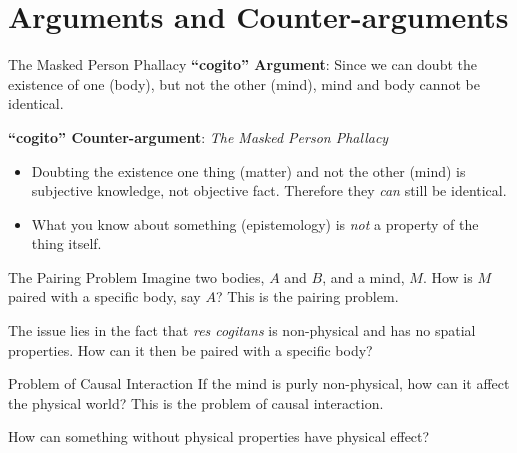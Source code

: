\documentclass[aspectratio=1610]{beamer}
\begin{document}
\section{Arguments and Counter-arguments}


\begin{frame}{The Masked Person Phallacy}
	\textbf{``cogito'' Argument}: Since we can doubt the existence of one (body), but not the other (mind), mind and body cannot be identical.

	\pause
	\vspace{2em}

	\textbf{``cogito'' Counter-argument}: \textit{The Masked Person Phallacy}
	\begin{itemize}
		\pause
		\item Doubting the existence one thing (matter) and not the other (mind) is subjective knowledge, not objective fact. Therefore they \textit{can} still be identical.
		\pause
		\item What you know about something (epistemology) is \textit{not} a property of the thing itself.
	\end{itemize}
\end{frame}


\begin{frame}{The Pairing Problem}
	Imagine two bodies, $A$ and $B$, and a mind, $M$. How is $M$ paired with a specific body, say $A$? This is the \alert{pairing problem}.

	\pause
	\vspace{2em}

	The issue lies in the fact that \textit{res cogitans} is non-physical and has no spatial properties. How can it then be paired with a specific body?
\end{frame}


\begin{frame}{Problem of Causal Interaction}
	If the mind is purly non-physical, how can it affect the physical world? This is the \alert{problem of causal interaction}.

	How can something without physical properties have physical effect?
\end{frame}
\end{document}
